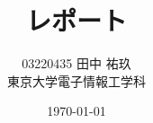 \documentclass[uplatex]{jsarticle}
\begin{document}
\title{\bf{\Large{レポート}}}
\author{03220435 田中 祐玖\\東京大学電子情報工学科}
\date{\today}
\maketitle

\begin{thebibliography}{99}

\end{thebibliography}
\end{document}
